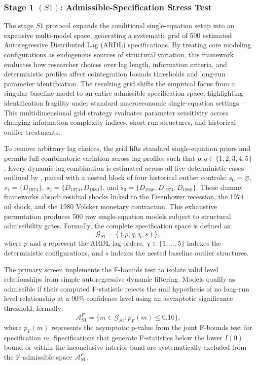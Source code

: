 \documentclass[11pt]{article}
\begin{document}
\subsubsection{Stage 1 \texorpdfstring{$(S1)$}{}: Admissible-Specification Stress Test}
\label{subsec:S1_admissible_spec}

The stage $S1$ protocol expands the conditional single-equation setup into an expansive multi-model space, generating a systematic grid of 500 estimated Autoregressive Distributed Lag (ARDL) specifications. By treating core modeling configurations as endogenous sources of structural variation, this framework evaluates how researcher choices over lag length, information criteria, and deterministic profiles affect cointegration bounds thresholds and long-run parameter identification. The resulting grid shifts the empirical focus from a singular baseline model to an entire admissible specification space, highlighting identification fragility under standard macroeconomic single-equation settings. This multidimensional grid strategy evaluates parameter sensitivity across changing information complexity indices, short-run structures, and historical outlier treatments.

To remove arbitrary lag choices, the grid lifts standard single-equation priors and permits full combinatoric variation across lag profiles such that $p,q \in \{1,2,3,4,5\}$. Every dynamic lag combination is estimated across all five deterministic cases outlined by \citet{Pesaran2001}, paired with a nested block of four historical outlier controls: $s_0=\varnothing$, $s_1=\{D_{1974}\}$, $s_2=\{D_{1974},D_{1980}\}$, and $s_3=\{D_{1956},D_{1974},D_{1980}\}$. These dummy frameworks absorb residual shocks linked to the Eisenhower recession, the 1974 oil shock, and the 1980 Volcker monetary contraction. This exhaustive permutation produces 500 raw single-equation models subject to structural admissibility gates. Formally, the complete specification space is defined as:
\begin{equation}
\mathcal{G}_{S1} = \{(p,q,\chi,s)\},
\label{eq:G_S1}
\end{equation}
where $p$ and $q$ represent the ARDL lag orders, $\chi \in \{1,\dots,5\}$ indexes the deterministic configurations, and $s$ indexes the nested baseline outlier structures.

The primary screen implements the F-bounds test to isolate valid level relationships from simple autoregressive dynamic filtering. Models qualify as admissible if their computed F-statistic rejects the null hypothesis of no long-run level relationship at a 90\% confidence level using an asymptotic significance threshold, formally:
\begin{equation}
\mathcal{A}^{F}_{S1} = \{ m \in \mathcal{G}_{S1} : p_F(m) \leq 0.10 \},
\label{eq:A_F_S1}
\end{equation}
where $p_F(m)$ represents the asymptotic p-value from the joint F-bounds test for specification $m$. Specifications that generate F-statistics below the lower $I(0)$ bound or within the inconclusive interior band are systematically excluded from the F-admissible space $\mathcal{A}^{F}_{S1}$.
\end{document}
